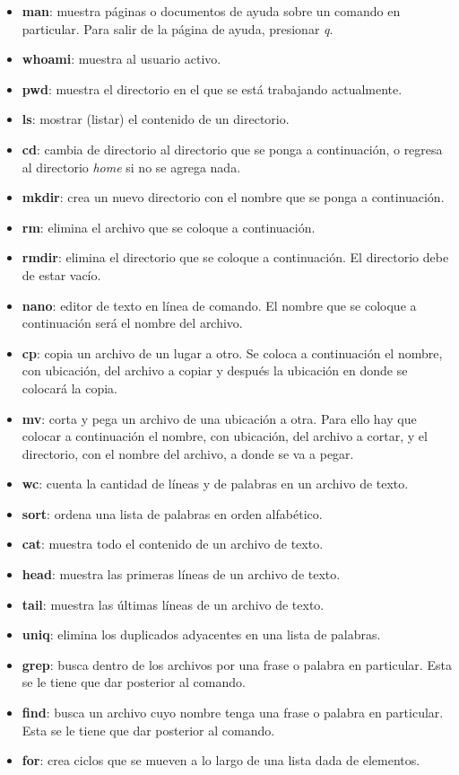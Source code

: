 \documentclass[10pt,letterpaper]{article}
\begin{document}
\begin{itemize}
\item \textbf{man}: muestra p\'aginas o documentos de ayuda sobre un comando en particular. Para salir de la p\'agina de ayuda, presionar \emph{q}.
\item \textbf{whoami}: muestra al usuario activo.
\item \textbf{pwd}: muestra el directorio en el que se est\'a trabajando actualmente.
\item \textbf{ls}: mostrar (listar) el contenido de un directorio.
\item \textbf{cd}: cambia de directorio al directorio que se ponga a continuaci\'on, o regresa al directorio \emph{home} si no se agrega nada.
\item \textbf{mkdir}: crea un nuevo directorio con el nombre que se ponga a continuaci\'on.
\item \textbf{rm}: elimina el archivo que se coloque a continuaci\'on.
\item \textbf{rmdir}: elimina el directorio que se coloque a continuaci\'on. El directorio debe de estar vac\'io.
\item \textbf{nano}: editor de texto en l\'inea de comando. El nombre que se coloque a continuaci\'on ser\'a el nombre del archivo.
\item \textbf{cp}: copia un archivo de un lugar a otro. Se coloca a continuaci\'on el nombre, con ubicaci\'on, del archivo a copiar y despu\'es la ubicaci\'on en donde se colocar\'a la copia.
\item \textbf{mv}: corta y pega un archivo de una ubicaci\'on a otra. Para ello hay que colocar a continuaci\'on el nombre, con ubicaci\'on, del archivo a cortar, y el directorio, con el nombre del archivo, a donde se va a pegar.
\item \textbf{wc}: cuenta la cantidad de l\'ineas y de palabras en un archivo de texto.
\item \textbf{sort}: ordena una lista de palabras en orden alfab\'etico.
\item \textbf{cat}: muestra todo el contenido de un archivo de texto.
\item \textbf{head}: muestra las primeras l\'ineas de un archivo de texto.
\item \textbf{tail}: muestra las \'ultimas l\'ineas de un archivo de texto.
\item \textbf{uniq}: elimina los duplicados adyacentes en una lista de palabras.
\item \textbf{grep}: busca dentro de los archivos por una frase o palabra en particular. Esta se le tiene que dar posterior al comando.
\item \textbf{find}: busca un archivo cuyo nombre tenga una frase o palabra en particular. Esta se le tiene que dar posterior al comando.
\item \textbf{for}: crea ciclos que se mueven a lo largo de una lista dada de elementos.
\end{itemize}
\end{document}
